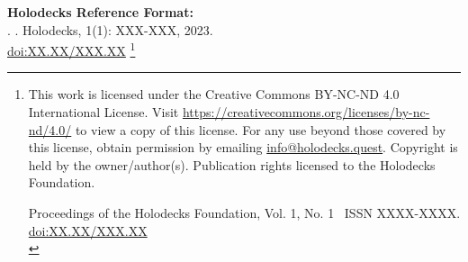 \documentclass[sigconf, nonacm]{acmart}
\newcommand\holodoi{XX.XX/XXX.XX}
\newcommand\holopages{XXX-XXX}
\newcommand\holovolume{1}
\newcommand\holoissue{1}
\newcommand\holoyear{2023}
\newcommand\holoauthors{\authors}
\newcommand\holotitle{\shorttitle}
\newcommand\holopagestyle{plain}
\begin{document}
\begin{abstract}
What is a Holodeck?  ChatGPT said ``A holodeck, short for "holographic deck," is a fictional technology that appears in the Star Trek science fiction franchise. It is a key feature on starships and space stations in the Star Trek universe, particularly on Federation starships. The holodeck is a highly advanced and immersive virtual reality environment that uses a combination of holographic projectors, force fields, replicators, and other advanced technologies to create highly realistic and interactive simulations.

Within a holodeck, users can experience a wide range of environments, scenarios, and adventures. They can interact with computer-generated characters, objects, and settings as if they were real. The holodeck can be used for training, recreation, scientific research, and entertainment. It is often used by the crew of starships to relax, exercise, or engage in historical and adventure simulations.

The concept of the holodeck has captured the imagination of many Star Trek fans and has inspired discussions and speculation about the feasibility of creating such immersive virtual environments in real life, although, as of my last knowledge update in January 2022, we are still far from achieving the level of technology depicted in the Star Trek series.  An ACM Multimedia Asia 2021 article describes the technology."  That would be~\cite{shahram2021,shahram2022}.
\end{abstract}

\maketitle

\pagestyle{\holopagestyle}
\begingroup\small\noindent\raggedright\textbf{Holodecks Reference Format:}\\
\holoauthors. \holotitle. Holodecks, \holovolume(\holoissue): \holopages, \holoyear.\\
\href{https://doi.org/\holodoi}{doi:\holodoi}
\endgroup
\begingroup
\renewcommand\thefootnote{}\footnote{\noindent
This work is licensed under the Creative Commons BY-NC-ND 4.0 International License. Visit \url{https://creativecommons.org/licenses/by-nc-nd/4.0/} to view a copy of this license. For any use beyond those covered by this license, obtain permission by emailing \href{mailto:info@holodecks.quest}{info@holodecks.quest}. Copyright is held by the owner/author(s). Publication rights licensed to the Holodecks Foundation. \\
\raggedright Proceedings of the Holodecks Foundation, Vol. \holovolume, No. \holoissue\ %
ISSN XXXX-XXXX. \\
\href{https://doi.org/\holodoi}{doi:\holodoi} \\
}\addtocounter{footnote}{-1}\endgroup
\end{document}
